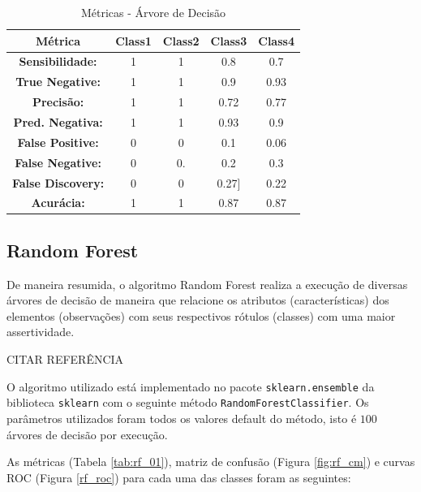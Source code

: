 \documentclass[
	article,			%
	11pt,				%
	oneside,			%
	a4paper,			%
	english,			%
	brazil,				%
	sumario=tradicional
	]{abntex2}
\begin{document}
\begin{table}[]
\centering
\begin{tabular}{|c|c|c|c|c|}
\hline
\textbf{Métrica}         & \textbf{Class1} & \textbf{Class2} & \textbf{Class3} & \textbf{Class4} \\ \hline
\textbf{Sensibilidade:}  & 1               & 1               & 0.8             & 0.7             \\ \hline
\textbf{True Negative:}  & 1               & 1               & 0.9             & 0.93            \\ \hline
\textbf{Precisão:}       & 1               & 1               & 0.72            & 0.77            \\ \hline
\textbf{Pred. Negativa:} & 1               & 1               & 0.93            & 0.9             \\ \hline
\textbf{False Positive:} & 0               & 0               & 0.1             & 0.06            \\ \hline
\textbf{False Negative:} & 0               & 0.              & 0.2             & 0.3             \\ \hline
\textbf{False Discovery:}    & 0               & 0               & 0.27{]}         & 0.22            \\ \hline
\textbf{Acurácia:}       & 1               & 1               & 0.87            & 0.87            \\ \hline
\end{tabular}
\caption{Métricas - Árvore de Decisão}
\label{tab:metrics_dt}
\end{table}


\subsection{Random Forest}

De maneira resumida, o algoritmo Random Forest realiza a execução de diversas árvores de decisão de maneira que  relacione os atributos (características) dos elementos (observações) com seus respectivos rótulos (classes) com uma maior assertividade. 

CITAR REFERÊNCIA

O algoritmo utilizado está implementado no pacote \verb|sklearn.ensemble| da biblioteca \verb|sklearn| com o seguinte método \verb|RandomForestClassifier|. Os parâmetros utilizados foram todos os valores default do método, isto é $100$ árvores de decisão por execução.

As métricas (Tabela \ref{tab:rf_01}), matriz de confusão (Figura \ref{fig:rf_cm}) e curvas ROC (Figura \ref{rf_roc}) para cada uma das classes foram as seguintes:
\end{document}
